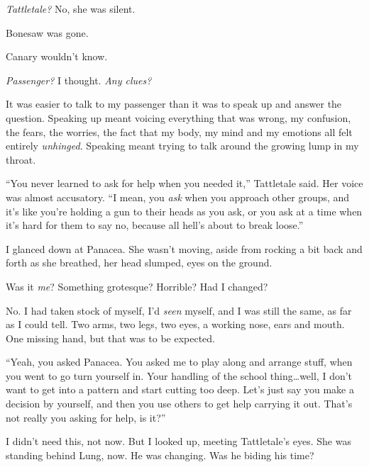 \emph{Tattletale?  }No, she was silent.



Bonesaw was gone.



Canary wouldn't know.



\emph{Passenger?}  I thought.  \emph{Any clues?}



It was easier to talk to my passenger than it was to speak up and answer the question.  Speaking up meant voicing everything that was wrong, my confusion, the fears, the worries, the fact that my body, my mind and my emotions all felt entirely \emph{unhinged}.  Speaking meant trying to talk around the growing lump in my throat.



``You never learned to ask for help when you needed it,'' Tattletale said.  Her voice was almost accusatory.  ``I mean, you \emph{ask} when you approach other groups, and it's like you're holding a gun to their heads as you ask, or you ask at a time when it's hard for them to say no, because all hell's about to break loose.''



I glanced down at Panacea.  She wasn't moving, aside from rocking a bit back and forth as she breathed, her head slumped, eyes on the ground.



Was it \emph{me}?  Something grotesque?  Horrible?  Had I changed?



No.  I had taken stock of myself, I'd \emph{seen} myself, and I was still the same, as far as I could tell.  Two arms, two legs, two eyes, a working nose, ears and mouth.  One missing hand, but that was to be expected.



``Yeah, you asked Panacea.  You asked me to play along and arrange stuff, when you went to go turn yourself in.  Your handling of the school thing\ldots well, I don't want to get into a pattern and start cutting too deep.  Let's just say you make a decision by yourself, and then you use others to get help carrying it out.  That's not really you asking for help, is it?''



I didn't need this, not now.  But I looked up, meeting Tattletale's eyes.  She was standing behind Lung, now.  He was changing.  Was he biding his time?



